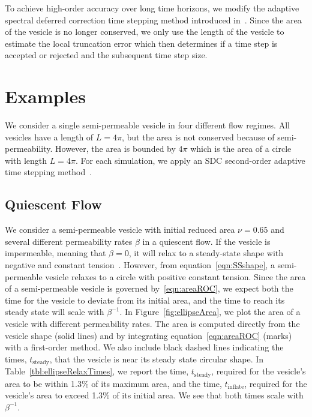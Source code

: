 \documentclass[9pt,twocolumn,twoside,lineno]{pnas-new}
\begin{document}
To achieve high-order accuracy over long time horizons, we modify the
adaptive spectral deferred correction time stepping method introduced
in~\cite{qua-bir2016}. Since the area of the vesicle is no longer
conserved, we only use the length of the vesicle to estimate the
local truncation error which then determines if a time step is accepted
or rejected and the subsequent time step size.

\section*{Examples}
We consider a single semi-permeable vesicle in four different flow
regimes. All vesicles have a length of $L=4\pi$, but the area is not
conserved because of semi-permeability. However, the area is bounded by
$4\pi$ which is the area of a circle with length $L=4\pi$. For each
simulation, we apply an SDC second-order adaptive time stepping
method~\cite{qua-bir2016}. 



\subsection*{Quiescent Flow} 
We consider a semi-permeable vesicle with initial reduced area $\nu =
0.65$ and several different permeability rates $\beta$ in a quiescent
flow. If the vesicle is impermeable, meaning that $\beta = 0$, it will
relax to a steady-state shape with negative and constant
tension~\cite{kra-win-sei-lip1996}. However, from
equation~\eqref{eqn:SSshape}, a semi-permeable vesicle relaxes to a
circle with positive constant tension. Since the area of a
semi-permeable vesicle is governed by~\eqref{eqn:areaROC}, we expect
both the time for the vesicle to deviate from its initial area, and the
time to reach its steady state will scale with $\beta^{-1}$. In
Figure~\ref{fig:ellipseArea}, we plot the area of a vesicle with
different permeability rates. The area is computed directly from the
vesicle shape (solid lines) and by integrating
equation~\eqref{eqn:areaROC} (marks) with a first-order method. We also
include black dashed lines indicating the times, $t_{\mathrm{steady}}$,
that the vesicle is near its steady state circular shape. In
Table~\ref{tbl:ellipseRelaxTimes}, we report the time,
$t_\mathrm{steady}$, required for the vesicle's area to be within 1.3\%
of its maximum area, and the time, $t_\mathrm{inflate}$, required for
the vesicle's area to exceed 1.3\% of its initial area. We see that both
times scale with $\beta^{-1}$. 
\end{document}
